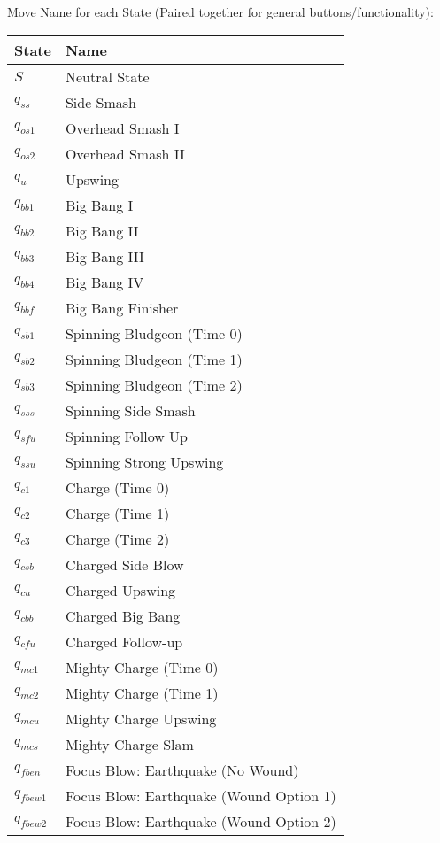 \documentclass{article}
\begin{document}
\begin{mylist}
Move Name for each State (Paired together for general buttons/functionality): \\
\begin{table}[h] 
  \begin{tabular}{l | l}
    State & Name  \\
    \hline
    $S$ & Neutral State \\
    $q_{ss}$ & Side Smash \\
    $q_{os1}$ & Overhead Smash I \\
    $q_{os2}$ & Overhead Smash II \\
    $q_{u}$ & Upswing \\
    $q_{bb1}$ & Big Bang I \\
    $q_{bb2}$ & Big Bang II \\
    $q_{bb3}$ & Big Bang III \\
    $q_{bb4}$ & Big Bang IV \\
    $q_{bbf}$ & Big Bang Finisher\\
    $q_{sb1}$ & Spinning Bludgeon (Time 0)\\
    $q_{sb2}$ & Spinning Bludgeon (Time 1)\\
    $q_{sb3}$ & Spinning Bludgeon (Time 2)\\
    $q_{sss}$ & Spinning Side Smash\\
    $q_{sfu}$ & Spinning Follow Up\\
    $q_{ssu}$ & Spinning Strong Upswing\\
    $q_{c1}$ & Charge (Time 0)\\
    $q_{c2}$ & Charge (Time 1)\\
    $q_{c3}$ & Charge (Time 2)\\
    $q_{csb}$ & Charged Side Blow\\
    $q_{cu}$ & Charged Upswing\\
    $q_{cbb}$ & Charged Big Bang\\
    $q_{cfu}$ & Charged Follow-up\\
    $q_{mc1}$ & Mighty Charge (Time 0)\\
    $q_{mc2}$ & Mighty Charge (Time 1)\\
    $q_{mcu}$ & Mighty Charge Upswing\\
    $q_{mcs}$ & Mighty Charge Slam\\
    $q_{fben}$ & Focus Blow: Earthquake (No Wound)\\
    $q_{fbew1}$ & Focus Blow: Earthquake (Wound Option 1)\\
    $q_{fbew2}$ & Focus Blow: Earthquake (Wound Option 2)\\

\end{tabular}
\end{table}
\end{mylist}
\end{document}
